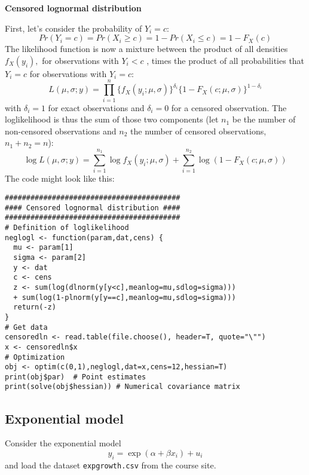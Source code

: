 \documentclass{article}
\begin{document}
\begin{solution}
\textbf{Censored lognormal distribution}

First, let's consider the probability of $Y_i=c$:
\begin{equation*}
  Pr(Y_i = c) = Pr(X_i \geq c) = 1 - Pr(X_i \leq c) = 1- F_X(c)
\end{equation*}
The likelihood function is now a mixture between the product of all densities $f_{X}(y_{i}),$ for observations with $Y_{i}<c$%
, times the product of all probabilities that $Y_{i}=c$ for observations with
$Y_{i}=c$:
\begin{equation*}
L(\mu,\sigma; y) = \prod_{i=1}^n\{ f_X(y_i;\mu,\sigma)\}^{\delta_i}\{1-F_X(c;\mu,\sigma)\}^{1-\delta_i}
\end{equation*}
with $\delta_i=1$ for exact observations and $\delta_i=0$ for a censored
observation. The loglikelihood is thus the sum of those two components (let
$n_1$ be the number of non-censored observations and $n_2$ the number of
censored observations, $n_1+n_2=n$):
\begin{equation*}
\log L(\mu,\sigma; y) = \sum_{i=1}^{n_1} \log f_X(y_i;\mu,\sigma) +
\sum_{i=1}^{n_2} \log(1-F_X(c;\mu,\sigma))
\end{equation*}
The code might look like this:
\begin{verbatim}
#########################################
#### Censored lognormal distribution ####
#########################################
# Definition of loglikelihood
neglogl <- function(param,dat,cens) {
  mu <- param[1]
  sigma <- param[2]
  y <- dat
  c <- cens
  z <- sum(log(dlnorm(y[y<c],meanlog=mu,sdlog=sigma)))
  + sum(log(1-plnorm(y[y==c],meanlog=mu,sdlog=sigma)))
  return(-z)
}
# Get data
censoredln <- read.table(file.choose(), header=T, quote="\"")
x <- censoredln$x
# Optimization
obj <- optim(c(0,1),neglogl,dat=x,cens=12,hessian=T)
print(obj$par)  # Point estimates
print(solve(obj$hessian)) # Numerical covariance matrix
\end{verbatim}
\end{solution}

\subsection{Exponential model}

Consider the exponential model%
\begin{equation*}
y_{i}=\exp \left( \alpha +\beta x_{i}\right) +u_{i}
\end{equation*}%
and load the dataset \texttt{expgrowth.csv} from the course site.
\end{document}
